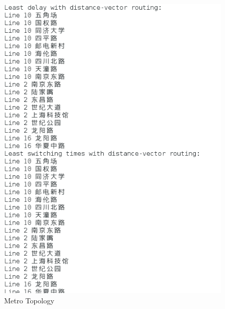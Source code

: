\documentclass[12pt]{article}
\begin{document}
\begin{figure}[H]
	\begin{center}
		\includegraphics[width=1\textwidth]{figures/4}
	\end{center}
	\caption{Metro Topology}
	\label{1}
\end{figure}
\end{document}
